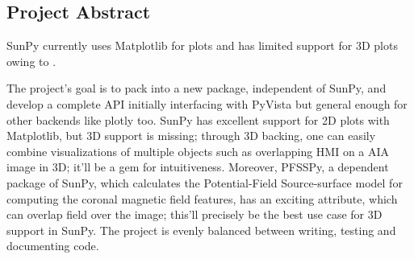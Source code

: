 \subsection{Project Abstract}
SunPy currently uses Matplotlib for plots and has limited support for 3D plots owing to \pr. 

The project's goal is to pack \pr into a new package, independent of SunPy, and develop a complete API initially interfacing with PyVista but general enough for other backends like plotly too. 
SunPy has excellent support for 2D plots with Matplotlib, but 3D support is missing; through 3D backing, one can easily combine visualizations of multiple objects such as overlapping HMI on a AIA image in 3D; it'll be a gem for intuitiveness. Moreover, PFSSPy, a dependent package of SunPy, which calculates the Potential-Field Source-surface model for computing the coronal magnetic field features, has an exciting attribute, which can overlap field over the image; this'll precisely be the best use case for 3D support in SunPy.
The project is evenly balanced between writing, testing and documenting code.

